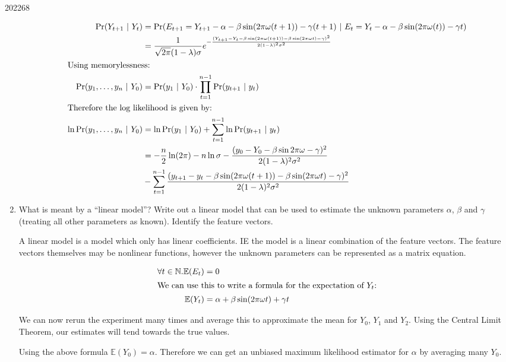 \documentclass[10pt,\jkfside,a4paper]{article}
\begin{document}
\begin{examquestion}{2022}{6}{8}
\begin{enumerate}[label=(\alph*)]
\begin{align*}
\Pr(Y_{t+1} \ | \ Y_t)
&= \Pr(E_{t+1} = Y_{t+1} - \alpha - \beta\sin(2\pi\omega(t+1)) - \gamma(t +
 1) \ | \ E_t = Y_t - \alpha - \beta\sin(2\pi\omega(t)) - \gamma t) \\
&= \frac{1}{\sqrt{2\pi}(1 - \lambda)\sigma}e^{-\frac{
(Y_{t+1} - Y_t - \beta\sin(2\pi\omega(t+1)) - \beta\sin(2\pi\omega t) -
\gamma)^2}{2(1 - \lambda)^2\sigma^2}} \\
\intertext{Using memorylessness:}
\Pr(y_1,\dots, y_n \ | \ Y_0)
&= \Pr(y_1 \ | \ Y_0) \cdot \prod^{n-1}_{t=1} \Pr(y_{t+1} \ | \ y_t) \\
\intertext{Therefore the log likelihood is given by:}
\ln\Pr(y_1,\dots, y_n \ | \ Y_0) &=
\ln\Pr(y_1 \ | \ Y_0) + \sum^{n-1}_{t=1} \ln\Pr(y_{t+1} \ | \ y_t) \\
&=
-\frac{n}{2}\ln(2\pi) - n\ln\sigma - \frac{(y_0 - Y_0 - \beta\sin2\pi\omega
 - \gamma)^2}{2(1 - \lambda)^2\sigma^2} \\ & - \sum^{n-1}_{t=1} \frac{
 (y_{t+1} - y_t - \beta\sin(2\pi\omega(t+1)) - \beta\sin
 (2\pi\omega t) - \gamma)^2}{2(1 - \lambda)^2\sigma^2}
\end{align*}

\item What is meant by a ``linear model''? Write out a linear model that can
be used to estimate the unknown parameters $\alpha$, $\beta$ and $\gamma$
(treating all other parameters as known). Identify the feature vectors.

A linear model is a model which only has linear coefficients. IE the model
is a linear combination of the feature vectors. The feature vectors
themselves may be nonlinear functions, however the unknown parameters can be
represented as a matrix equation.

\begin{align*}
\forall t \in \mathbb{N}. \mathbb{E}(E_t) &= 0 \\
\intertext{We can use this to write a formula for the expectation of $Y_t$:}
\mathbb{E}(Y_t) &= \alpha + \beta\sin(2\pi\omega t) + \gamma t \\
\end{align*}

We can now rerun the experiment many times and average this to approximate
the mean for $Y_0$, $Y_1$ and $Y_2$. Using the Central Limit Theorem, our
estimates will tend towards the true values.

Using the above formula $\mathbb{E}(Y_0) = \alpha$. Therefore we can
get an unbiased maximum likelihood estimator for $\alpha$ by averaging many
$Y_0$.


\end{enumerate}
\end{examquestion}
\end{document}
